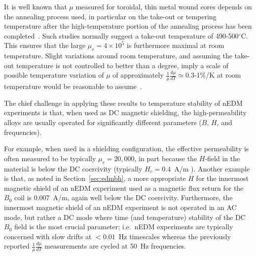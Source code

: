 \documentclass[review]{elsarticle}
\begin{document}
It is well known that $\mu$ measured for toroidal, thin metal wound
cores depends on the annealing process used, in particular on the
take-out or tempering temperature after the high-temperature portion
of the annealing process has been
completed~\cite{bib:pfeifer,bib:kruppvdm,bib:couderchon}.  Such
studies normally suggest a take-out temperature of 490-500$^\circ$C.
This ensures that the large $\mu_r=4\times 10^{5}$ is furthermore
maximal at room temperature.  Slight variations around room
temperature, and assuming the take-out temperature is not controlled
to better than a degree, imply a scale of possible temperature
variation of $\mu$ of approximately
$\frac{1}{\mu}\frac{d\mu}{dT}\simeq$0.3-1\%/K at room temperature would be
reasonable to assume~\cite{bib:couderchon,bib:kruppvdm}.

The chief challenge in applying these results to temperature stability
of nEDM experiments is that, when used as DC magnetic shielding, the
high-permeability alloys are usually operated for significantly
different parameters ($B$, $H$, and frequencies).

For example, when used in a shielding configuration, the effective
permeability is often measured to be typically $\mu_r=20,000$, in part
because the $H$-field in the material is below the DC coercivity
(typically $H_c=0.4$~A/m \cite{bib:kruppvdm}).  Another example is
that, as noted in Section~\ref{sec:edmbh}, a more appropriate $H$ for
the innermost magnetic shield of an nEDM experiment used as a magnetic
flux return for the $B_0$ coil is 0.007~A/m, again well below the DC
coercivity.  Furthermore, the innermost magnetic shield of an nEDM
experiment is not operated in an AC mode, but rather a DC mode where
time (and temperature) stability of the DC $B_0$ field is the most
crucial parameter; i.e.~nEDM experiments are typically concerned with
slow drifts at $<0.01$~Hz timescales whereas the previously reported
$\frac{1}{\mu}\frac{d\mu}{dT}$ measurements are cycled at 50~Hz
frequencies.
\end{document}
